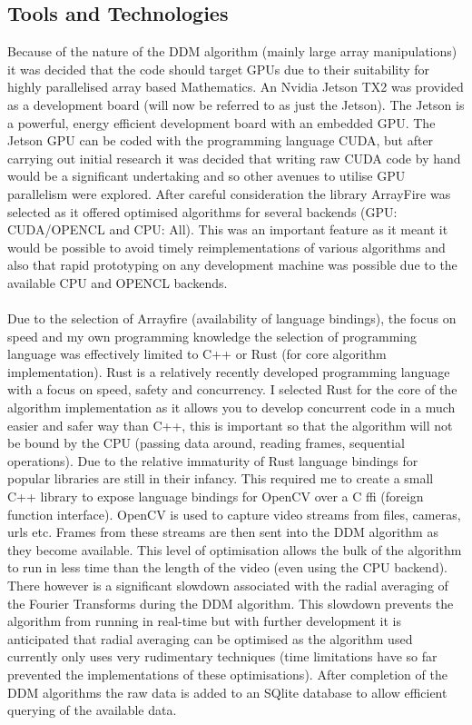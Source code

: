 \documentclass[11pt]{article}
\begin{document}
\subsection{Tools and Technologies}
Because of the nature of the DDM algorithm (mainly large array manipulations) it was decided that the code should target GPUs due to their suitability for highly parallelised array based Mathematics. An Nvidia Jetson TX2 was provided as a development board (will now be referred to as just the Jetson). The Jetson is a powerful, energy efficient development board with an embedded GPU\cite{jetson}. The Jetson GPU can be coded with the programming language CUDA, but after carrying out initial research \cite{cuda_book} it was decided that writing raw CUDA code by hand would be a significant undertaking and so other avenues to utilise GPU parallelism were explored. After careful consideration the library ArrayFire was selected as it offered optimised algorithms for several backends (GPU: CUDA/OPENCL and CPU: All)\cite{arrayfire}. This was an important feature as it meant it would be possible to avoid timely reimplementations of various algorithms and also that rapid prototyping on any development machine was possible due to the available CPU and OPENCL backends.
\\\\
Due to the selection of Arrayfire (availability of language bindings), the focus on speed and my own programming knowledge the selection of programming language was effectively limited to C++ or Rust \cite{rust} (for core algorithm implementation). Rust is a relatively recently developed programming language with a focus on speed, safety and concurrency. I selected Rust for the core of the algorithm implementation as it allows you to develop concurrent code in a much easier and safer way than C++, this is important so that the algorithm will not be bound by the CPU (passing data around, reading frames, sequential operations). Due to the relative immaturity of Rust language bindings for popular libraries are still in their infancy. This required me to create a small C++ library to expose language bindings for OpenCV over a C ffi (foreign function interface). OpenCV is used to capture video streams from files, cameras, urls etc. Frames from these streams are then sent into the DDM algorithm as they become available. This level of optimisation allows the bulk of the algorithm to run in less time than the length of the video (even using the CPU backend). There however is a significant slowdown associated with the radial averaging of the Fourier Transforms during the DDM algorithm. This slowdown prevents the algorithm from running in real-time but with further development it is anticipated that radial averaging can be optimised as the algorithm used currently only uses very rudimentary techniques (time limitations have so far prevented the implementations of these optimisations). After completion of the DDM algorithms the raw data is added to an SQlite database to allow efficient querying of the available data.
\end{document}
